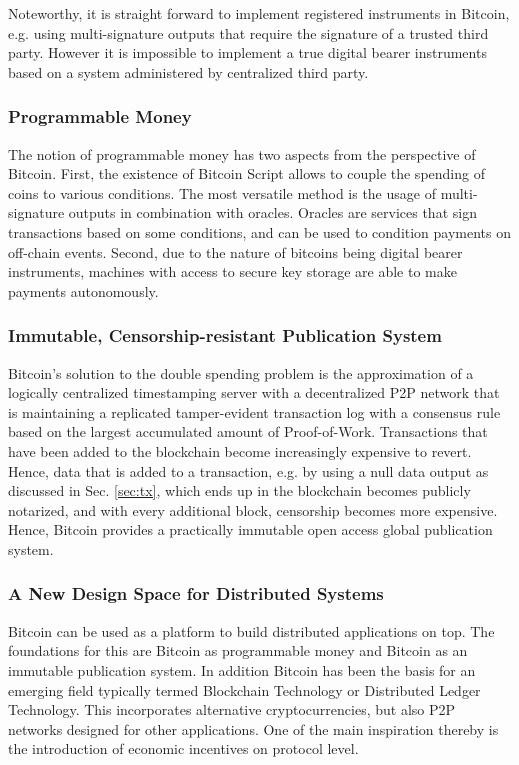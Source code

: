 Noteworthy, it is straight forward to implement registered instruments in Bitcoin, e.g. using multi-signature outputs that require the signature of a trusted third party. However it is impossible to implement a true digital bearer instruments based on a system administered by centralized third party.

\subsubsection{Programmable Money}

The notion of programmable money has two aspects from the perspective of Bitcoin. First, the existence of Bitcoin Script allows to couple the spending of coins to various conditions. The most versatile method is the usage of multi-signature outputs in combination with oracles. Oracles are services that sign transactions based on some conditions, and can be used to condition payments on off-chain events. Second, due to the nature of bitcoins being digital bearer instruments, machines with access to secure key storage are able to make payments autonomously.  

\subsubsection{Immutable, Censorship-resistant Publication System}

Bitcoin's solution to the double spending problem is the approximation of a logically centralized timestamping server with a decentralized P2P network that is maintaining a replicated tamper-evident transaction log with a consensus rule based on the largest accumulated amount of Proof-of-Work. Transactions that have been added to the blockchain become increasingly expensive to revert. Hence, data that is added to a transaction, e.g. by using a null data output as discussed in Sec. \ref{sec:tx}, which ends up in the blockchain becomes publicly notarized, and with every additional block, censorship becomes more expensive. Hence, Bitcoin provides a practically immutable open access global publication system.

\subsubsection{A New Design Space for Distributed Systems}

Bitcoin can be used as a platform to build distributed applications on top. The foundations for this are Bitcoin as programmable money and Bitcoin as an immutable publication system. In addition Bitcoin has been the basis for an emerging field typically termed Blockchain Technology or Distributed Ledger Technology. This incorporates alternative cryptocurrencies, but also P2P networks designed for other applications. One of the main inspiration thereby is the introduction of economic incentives on protocol level. 

